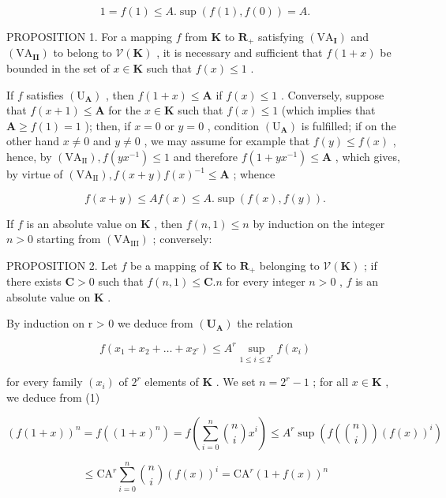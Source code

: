 \[
1 = f (1) \leqslant A. \sup (f (1), f (0)) = A.
\]

PROPOSITION 1. For a mapping \(f\) from \(\mathbf{K}\) to \(\mathbf{R}_+\) satisfying \((\mathrm{VA}_{\mathbf{I}})\) and \((\mathrm{VA}_{\mathbf{II}})\) to belong to \(\mathcal{V}(\mathbf{K})\) , it is necessary and sufficient that \(f(1 + x)\) be bounded in the set of \(x \in \mathbf{K}\) such that \(f(x) \leqslant 1\) .

If \(f\) satisfies \((\mathrm{U}_{\mathbf{A}})\) , then \(f(1 + x) \leqslant \mathbf{A}\) if \(f(x) \leqslant 1\) . Conversely, suppose that \(f(x + 1) \leqslant \mathbf{A}\) for the \(x \in \mathbf{K}\) such that \(f(x) \leqslant 1\) (which implies that \(\mathbf{A} \geqslant f(1) = 1\) ); then, if \(x = 0\) or \(y = 0\) , condition \((\mathrm{U}_{\mathbf{A}})\) is fulfilled; if on the other hand \(x \neq 0\) and \(y \neq 0\) , we may assume for example that \(f(y) \leqslant f(x)\) , hence, by \((\mathrm{VA}_{\mathrm{II}}), f(yx^{-1}) \leqslant 1\) and therefore \(f(1 + yx^{-1}) \leqslant \mathbf{A}\) , which gives, by virtue of \((\mathrm{VA}_{\mathrm{II}}), f(x + y)f(x)^{-1} \leqslant \mathbf{A}\) ; whence

\[
f (x + y) \leqslant A f (x) \leqslant A. \sup (f (x), f (y)).
\]

If \(f\) is an absolute value on \(\mathbf{K}\) , then \(f(n,1) \leqslant n\) by induction on the integer \(n > 0\) starting from \((\mathrm{VA}_{\mathrm{III}})\) ; conversely:

PROPOSITION 2. Let \(f\) be a mapping of \(\mathbf{K}\) to \(\mathbf{R}_+\) belonging to \(\mathcal{V}(\mathbf{K})\) ; if there exists \(\mathbf{C} > 0\) such that \(f(n,1) \leqslant \mathbf{C}.n\) for every integer \(n > 0\) , \(f\) is an absolute value on \(\mathbf{K}\) .

By induction on r > 0 we deduce from \((\mathbf{U}_{\mathbf{A}})\) the relation

\[
f (x _ {1} + x _ {2} + \dots + x _ {2 ^ {r}}) \leqslant A ^ {r} \sup _ {1 \leqslant i \leqslant 2 ^ {r}} f (x _ {i})\tag{1}
\]

for every family \((x_{i})\) of \(2^{r}\) elements of \(\mathbf{K}\) . We set \(n = 2^{r} - 1\) ; for all \(x \in \mathbf{K}\) , we deduce from (1)

\[
(f (1 + x)) ^ {n} = f ((1 + x) ^ {n}) = f \left(\sum_ {i = 0} ^ {n} \binom {n} {i} x ^ {i}\right) \leqslant A ^ {r} \sup \left(f \left(\binom {n} {i}\right) (f (x)) ^ {i}\right)
\]

\[
\leqslant \mathrm{CA} ^ {r} \sum_ {i = 0} ^ {n} \binom {n} {i} (f (x)) ^ {i} = \mathrm{CA} ^ {r} (1 + f (x)) ^ {n}
\]

